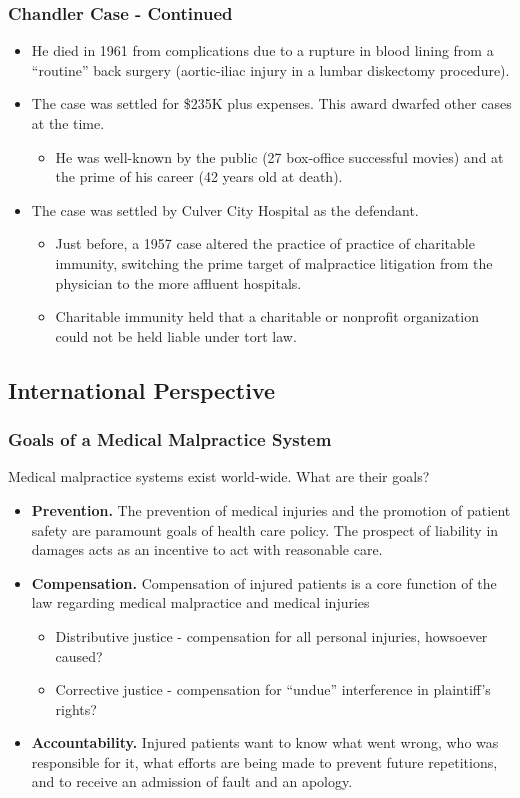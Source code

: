 \documentclass[serif,10pt]{beamer}
\begin{document}
\begin{frame}
\frametitle{Chandler Case - Continued}
  \begin{itemize}
\item He died in 1961 from complications due to a rupture in blood lining from a ``routine'' back surgery (aortic-iliac injury in a lumbar diskectomy procedure).
\item The case was settled for \$235K plus expenses. This award dwarfed other cases at the time.
 \begin{itemize}\item He was well-known by the public (27 box-office successful movies) and at the prime of his career (42 years old at death).\end{itemize}
\item The case was settled by Culver City Hospital as the defendant.
 \begin{itemize}\item Just before, a 1957 case altered the practice of practice of charitable immunity, switching the prime target of malpractice litigation from the physician to the more affluent hospitals.
 \item Charitable immunity held that a charitable or nonprofit organization could not be held liable under tort law.
 \end{itemize}
\end{itemize}
\end{frame}

\subsection{International Perspective}

\begin{frame}
\frametitle{Goals of a Medical Malpractice System}
Medical malpractice systems exist world-wide. What are their goals?
\begin{itemize}
\item \textbf{Prevention.} The prevention of medical injuries and the promotion of patient safety are paramount goals of health care policy. The prospect of liability in damages acts as an incentive to act with reasonable care.
\item \textbf{Compensation.} Compensation of injured patients is a core function of the law regarding medical malpractice and medical injuries
\begin{itemize}
\item Distributive justice - compensation for all personal injuries, howsoever caused?
\item Corrective justice - compensation for ``undue'' interference in plaintiff's rights?
\end{itemize}
\item \textbf{Accountability.} Injured patients want to know what went wrong, who was responsible for it, what efforts are being made to prevent future repetitions, and to receive an admission of fault and an apology.
\end{itemize}
\end{frame}
\end{document}
